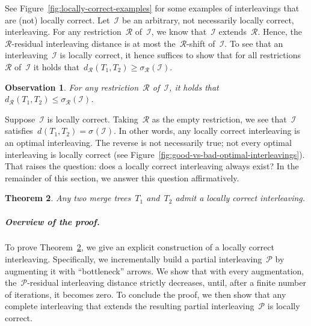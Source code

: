 \documentclass[11pt]{article}
\newtheorem{theorem}{Theorem}
\newtheorem{observation}[theorem]{Observation}
\newcommand{\shift}[1]{\sigma_{#1}}
\newcommand{\intdist}[1]{d^{{#1}}}
\newcommand{\resdist}[1]{d_{#1}}
\newcommand{\I}{\mathcal{I}}
\renewcommand{\P}{\mathcal{P}}
\newcommand{\R}{\mathcal{R}}
\begin{document}
%
\noindent
See Figure~\ref{fig:locally-correct-examples} for some examples of interleavings that are (not) locally correct.
%
Let~$\I$ be an arbitrary, not necessarily locally correct, interleaving.
For any restriction~$\R$ of~$\I$, we know that~$\I$ extends~$\R$.
Hence, the~$\R$-residual interleaving distance is at most the~$\R$-shift of~$\I$.
To see that an interleaving~$\I$ is locally correct, it hence suffices to show that for all restrictions~$\R$ of~$\I$ it holds that~$\resdist{\R}(T_1, T_2) \ge \shift{\R}(\I)$.
%
\begin{observation}\label{obs:locally-correct}
	For any restriction~$\R$ of~$\I$, it holds that~$\resdist{\R}(T_1, T_2) \le \shift{\R}(\I)$.
\end{observation}
%
\noindent
Suppose~$\I$ is locally correct.
Taking~$\R$ as the empty restriction, we see that~$\I$ satisfies~$\intdist{}(T_1, T_2) = \shift{}(\I)$.
In other words, any locally correct interleaving is an optimal interleaving.
The reverse is not necessarily true; not every optimal interleaving is locally correct (see Figure~\ref{fig:good-vs-bad-optimal-interleavings}).
That raises the question: does a locally correct interleaving always exist?
In the remainder of this section, we answer this question affirmatively.
%

\begin{theorem}\label{thm:existence-locally-correct}
	Any two merge trees~$T_1$ and~$T_2$ admit a locally correct interleaving.
\end{theorem}

%
\subparagraph{Overview of the proof.}
To prove Theorem~\ref{thm:existence-locally-correct}, we give an explicit construction of a locally correct interleaving.
Specifically, we incrementally build a partial interleaving~$\P$ by augmenting it with ``bottleneck'' arrows.
We show that with every augmentation, the~$\P$-residual interleaving distance strictly decreases, until, after a finite number of iterations, it becomes zero.
To conclude the proof, we then show that any complete interleaving that extends the resulting partial interleaving~$\P$ is locally correct.
%
\end{document}
